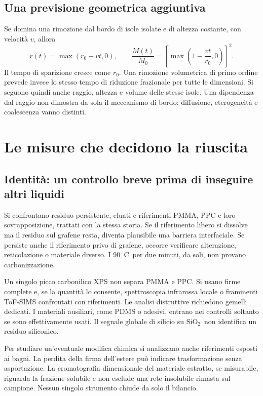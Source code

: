 \documentclass[11pt,reqno]{amsart}
\numberwithin{equation}{section}
\newcommand{\SiO}{\ensuremath{\mathrm{SiO}_2}}
\newcommand{\degC}{\ensuremath{^{\circ}\mathrm{C}}}
\begin{document}
\subsection{Una previsione geometrica aggiuntiva}
Se domina una rimozione dal bordo di isole isolate e di altezza
costante, con velocit\`a $v$, allora
\begin{equation}\label{eq:edge}
 r(t)=\max(r_0-vt,0),\qquad
 \frac{M(t)}{M_0}=\left[\max\left(1-\frac{vt}{r_0},0\right)\right]^2.
\end{equation}
Il tempo di sparizione cresce come $r_0$. Una rimozione
volumetrica di primo ordine prevede invece lo stesso tempo
di riduzione frazionale per tutte le dimensioni. Si seguono
quindi anche raggio, altezza e volume delle stesse isole.
Una dipendenza dal raggio non dimostra da sola il meccanismo
di bordo: diffusione, eterogeneit\`a e coalescenza vanno distinti.

\section{Le misure che decidono la riuscita}

\subsection{Identit\`a: un controllo breve prima di inseguire altri liquidi}
Si confrontano residuo persistente, eluati e riferimenti PMMA,
PPC e loro sovrapposizione, trattati con la stessa storia.
Se il riferimento libero si dissolve ma il residuo sul grafene
resta, diventa plausibile una barriera interfaciale. Se persiste
anche il riferimento privo di grafene, occorre verificare
alterazione, reticolazione o materiale diverso. I 90\,\degC\
per due minuti, da soli, non provano carbonizzazione.

Un singolo picco carbonilico XPS non separa PMMA e PPC.
Si usano firme complete e, se la quantit\`a lo consente,
spettroscopia infrarossa locale o frammenti ToF-SIMS confrontati
con riferimenti. Le analisi distruttive richiedono gemelli
dedicati. I materiali ausiliari, come PDMS o adesivi, entrano
nei controlli soltanto se sono effettivamente usati. Il segnale
globale di silicio su \SiO\ non identifica un residuo siliconico.

Per studiare un'eventuale modifica chimica si analizzano anche
riferimenti esposti ai bagni. La perdita della firma dell'estere
pu\`o indicare trasformazione senza asportazione. La cromatografia
dimensionale del materiale estratto, se misurabile, riguarda la
frazione solubile e non esclude una rete insolubile rimasta sul
campione. Nessun singolo strumento chiude da solo il bilancio.
\end{document}
